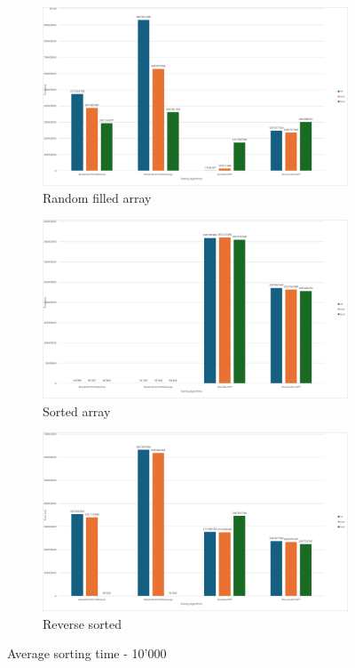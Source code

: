 \documentclass{article}
\begin{document}
\begin{figure}[!h]
    \centering
    \begin{subfigure}{0.7\textwidth}
        \includegraphics[width=1\linewidth]{avg10000rand.png}
        \caption{Random filled array}
        \label{fig:avg10000sort}
    \end{subfigure}
    \begin{subfigure}{0.45\textwidth}
        \includegraphics[width=1\linewidth]{avg10000sort.png}
        \caption{Sorted array}
        \label{fig:avg10000sort}
    \end{subfigure}
    \hfill
    \begin{subfigure}{0.45\textwidth}
        \includegraphics[width=1\linewidth]{avg10000rev.png}
        \caption{Reverse sorted}
        \label{fig:avg10000rev}
    \end{subfigure}
    \caption{Average sorting time - 10'000}
    \label{fig:avg10000}
\end{figure}
\end{document}
